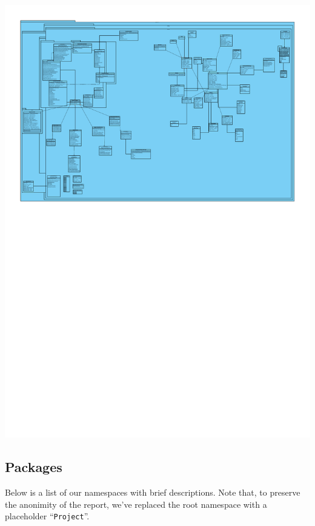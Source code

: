 \documentclass[a4paper, 12pt, titlepage]{article}
\begin{document}
  \includegraphics[width=\linewidth]{finalobject}

  \subsection{Packages}

  Below is a list of our namespaces with brief descriptions.
  Note that, to preserve the anonimity of the report, we've replaced the root namespace with a placeholder ``\texttt{Project}''.
\end{document}
